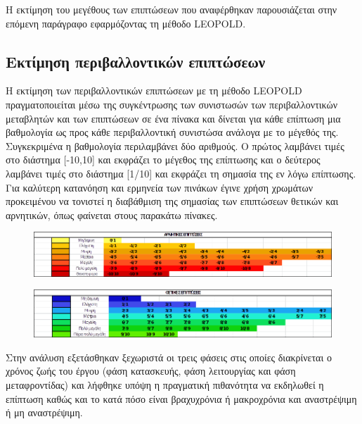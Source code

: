 \documentclass[12pt]{article}
\newcommand{\gr}{\selectlanguage{greek}}
\newcommand{\eng}{\selectlanguage{english}}
\begin{document}
 	Η εκτίμηση του μεγέθους των επιπτώσεων που αναφέρθηκαν παρουσιάζεται στην επόμενη παράγραφο εφαρμόζοντας τη μέθοδο \eng LEOPOLD.\gr
 	
 	\subsection{Εκτίμηση περιβαλλοντικών επιπτώσεων}
 	
 	Η εκτίμηση των περιβαλλοντικών επιπτώσεων με τη μέθοδο \eng LEOPOLD \gr πραγματοποιείται μέσω της συγκέντρωσης των συνιστωσών των περιβαλλοντικών μεταβλητών και των επιπτώσεων σε ένα πίνακα και δίνεται για κάθε επίπτωση μια βαθμολογία ως προς κάθε περιβαλλοντική συνιστώσα ανάλογα με το μέγεθός της. Συγκεκριμένα η βαθμολογία περιλαμβάνει δύο αριθμούς. Ο πρώτος λαμβάνει τιμές στο διάστημα [-10,10] και εκφράζει το μέγεθος της επίπτωσης και ο δεύτερος λαμβάνει τιμές στο διάστημα [1/10] και εκφράζει τη σημασία της εν λόγω επίπτωσης. Για καλύτερη κατανόηση και ερμηνεία των πινάκων έγινε χρήση χρωμάτων προκειμένου να τονιστεί η διαβάθμιση της σημασίας των επιπτώσεων θετικών και αρνητικών, όπως φαίνεται στους παρακάτω πίνακες. 
 	
 	\begin{figure} [H]
 		\begin{center}
 			\includegraphics [scale = 0.60] {table41.png}
 		\end{center}
 	\end{figure}
 
 	\begin{figure} [H]
 		\begin{center}
 			\includegraphics [scale = 0.65] {table42.png}
 		\end{center}
 	\end{figure}
 	
 	Στην ανάλυση εξετάσθηκαν ξεχωριστά οι τρεις φάσεις στις οποίες διακρίνεται ο χρόνος ζωής του έργου (φάση κατασκευής, φάση λειτουργίας και φάση μεταφροντίδας) και λήφθηκε υπόψη η πραγματική πιθανότητα να εκδηλωθεί η επίπτωση καθώς και το κατά πόσο είναι βραχυχρόνια ή μακροχρόνια και αναστρέψιμη ή μη αναστρέψιμη.
 	
\end{document}
